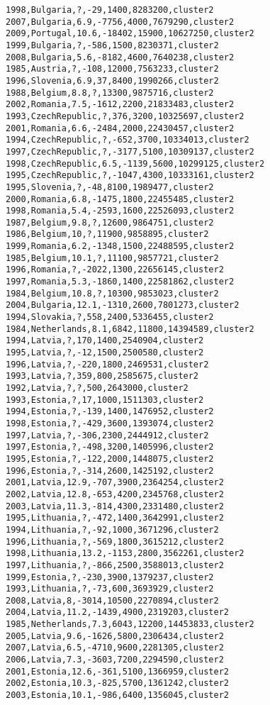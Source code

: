 \begin{lstlisting}[basicstyle=\footnotesize\ttfamily,numbers=none]
1998,Bulgaria,?,-29,1400,8283200,cluster2
2007,Bulgaria,6.9,-7756,4000,7679290,cluster2
2009,Portugal,10.6,-18402,15900,10627250,cluster2
1999,Bulgaria,?,-586,1500,8230371,cluster2
2008,Bulgaria,5.6,-8182,4600,7640238,cluster2
1985,Austria,?,-108,12000,7563233,cluster2
1996,Slovenia,6.9,37,8400,1990266,cluster2
1988,Belgium,8.8,?,13300,9875716,cluster2
2002,Romania,7.5,-1612,2200,21833483,cluster2
1993,CzechRepublic,?,376,3200,10325697,cluster2
2001,Romania,6.6,-2484,2000,22430457,cluster2
1994,CzechRepublic,?,-652,3700,10334013,cluster2
1997,CzechRepublic,?,-3177,5100,10309137,cluster2
1998,CzechRepublic,6.5,-1139,5600,10299125,cluster2
1995,CzechRepublic,?,-1047,4300,10333161,cluster2
1995,Slovenia,?,-48,8100,1989477,cluster2
2000,Romania,6.8,-1475,1800,22455485,cluster2
1998,Romania,5.4,-2593,1600,22526093,cluster2
1987,Belgium,9.8,?,12600,9864751,cluster2
1986,Belgium,10,?,11900,9858895,cluster2
1999,Romania,6.2,-1348,1500,22488595,cluster2
1985,Belgium,10.1,?,11100,9857721,cluster2
1996,Romania,?,-2022,1300,22656145,cluster2
1997,Romania,5.3,-1860,1400,22581862,cluster2
1984,Belgium,10.8,?,10300,9853023,cluster2
2004,Bulgaria,12.1,-1310,2600,7801273,cluster2
1994,Slovakia,?,558,2400,5336455,cluster2
1984,Netherlands,8.1,6842,11800,14394589,cluster2
1994,Latvia,?,170,1400,2540904,cluster2
1995,Latvia,?,-12,1500,2500580,cluster2
1996,Latvia,?,-220,1800,2469531,cluster2
1993,Latvia,?,359,800,2585675,cluster2
1992,Latvia,?,?,500,2643000,cluster2
1993,Estonia,?,17,1000,1511303,cluster2
1994,Estonia,?,-139,1400,1476952,cluster2
1998,Estonia,?,-429,3600,1393074,cluster2
1997,Latvia,?,-306,2300,2444912,cluster2
1997,Estonia,?,-498,3200,1405996,cluster2
1995,Estonia,?,-122,2000,1448075,cluster2
1996,Estonia,?,-314,2600,1425192,cluster2
2001,Latvia,12.9,-707,3900,2364254,cluster2
2002,Latvia,12.8,-653,4200,2345768,cluster2
2003,Latvia,11.3,-814,4300,2331480,cluster2
1995,Lithuania,?,-472,1400,3642991,cluster2
1994,Lithuania,?,-92,1000,3671296,cluster2
1996,Lithuania,?,-569,1800,3615212,cluster2
1998,Lithuania,13.2,-1153,2800,3562261,cluster2
1997,Lithuania,?,-866,2500,3588013,cluster2
1999,Estonia,?,-230,3900,1379237,cluster2
1993,Lithuania,?,-73,600,3693929,cluster2
2008,Latvia,8,-3014,10500,2270894,cluster2
2004,Latvia,11.2,-1439,4900,2319203,cluster2
1985,Netherlands,7.3,6043,12200,14453833,cluster2
2005,Latvia,9.6,-1626,5800,2306434,cluster2
2007,Latvia,6.5,-4710,9600,2281305,cluster2
2006,Latvia,7.3,-3603,7200,2294590,cluster2
2001,Estonia,12.6,-361,5100,1366959,cluster2
2002,Estonia,10.3,-825,5700,1361242,cluster2
2003,Estonia,10.1,-986,6400,1356045,cluster2

\end{lstlisting}
